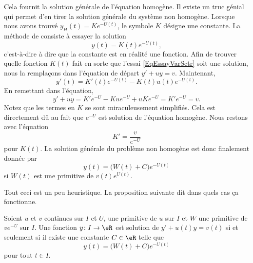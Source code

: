 Cela fournit la solution générale de l'équation homogène. Il existe un truc génial qui permet d'en tirer la solution générale du système non homogène. Lorsque nous avons trouvé \( y_H(t)=K e^{-U(t)}\), le symbole \( K\) désigne une constante. La méthode de  consiste à essayer la solution
\begin{equation}		\label{EqEssayVarSctr}
	y(t)=K(t) e^{-U(t)},
\end{equation}
c'est-à-dire à dire que la constante est en réalité une fonction. Afin de trouver quelle fonction \( K(t)\) fait en sorte que l'essai \eqref{EqEssayVarSctr} soit une solution, nous la remplaçons dans l'équation de départ \( y'+uy=v\). Maintenant,
\begin{equation}
	y'(t)=K'(t) e^{-U(t)}-K(t)u(t) e^{-U(t)}.
\end{equation}
En remettant dans l'équation,
\begin{equation}
	y'+uy=K' e^{-U}-Ku e^{-U}+uK e^{-U}=K' e^{-U}=v.
\end{equation}
Notez que les termes en \( K\) se sont miraculeusement simplifiés. Cela est directement dû au fait que \(  e^{-U}\) est solution de l'équation homogène. Nous restons avec l'équation
\begin{equation}
	K'=\frac{ v }{  e^{-U} }
\end{equation}
pour \( K(t)\). La solution générale du problème non homogène est donc finalement donnée par
\begin{equation}
	y(t)=\big( W(t)+C \big) e^{-U(t)}
\end{equation}
si \( W(t)\) est une primitive de \( v(t)e^{U(t)}\).

Tout ceci est un peu heuristique. La proposition suivante dit dans quels cas ça fonctionne.
\begin{proposition}     \label{PROPooZCXQooPQpkdQ}
	Soient \( u\) et \( v\) continues sur \( I\) et \( U\), une primitive de \( u\) sur \( I\) et \( W\) une primitive de \( v e^{-U}\) sur \( I\). Une fonction \( y\colon I\to \eR\) est solution de \( y'+u(t)y=v(t)\) si et seulement si il existe une constante \( C\in \eR\) telle que
	\begin{equation}
		y(t)=\big( W(t)+C \big) e^{-U(t)}
	\end{equation}
	pour tout \( t\in I\).
\end{proposition}


